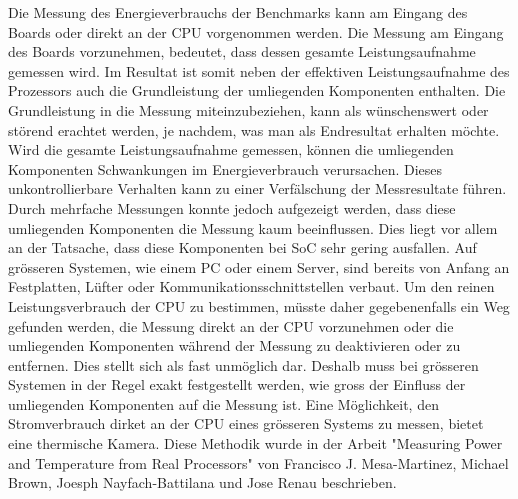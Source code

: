 Die Messung des Energieverbrauchs der Benchmarks kann am Eingang des Boards oder direkt an der CPU vorgenommen werden. Die Messung am Eingang des Boards vorzunehmen, bedeutet, dass dessen gesamte Leistungsaufnahme gemessen wird. Im Resultat ist somit neben der effektiven Leistungsaufnahme des Prozessors auch die Grundleistung der umliegenden Komponenten enthalten. Die Grundleistung in die Messung miteinzubeziehen, kann als wünschenswert oder störend erachtet werden, je nachdem, was man als Endresultat erhalten möchte. Wird die gesamte Leistungsaufnahme gemessen, können die umliegenden Komponenten Schwankungen im Energieverbrauch verursachen. Dieses unkontrollierbare Verhalten kann zu einer Verfälschung der Messresultate führen. Durch mehrfache Messungen konnte jedoch aufgezeigt werden, dass diese umliegenden Komponenten die Messung kaum beeinflussen. Dies liegt vor allem an der Tatsache, dass diese Komponenten bei SoC sehr gering ausfallen. Auf grösseren Systemen, wie einem PC oder einem Server, sind bereits von Anfang an Festplatten, Lüfter oder Kommunikationsschnittstellen verbaut. Um den reinen Leistungsverbrauch der CPU zu bestimmen, müsste daher gegebenenfalls ein Weg gefunden werden, die Messung direkt an der CPU vorzunehmen oder die umliegenden Komponenten während der Messung zu deaktivieren oder zu entfernen. Dies stellt sich als fast unmöglich dar. Deshalb muss bei grösseren Systemen in der Regel exakt festgestellt werden, wie gross der Einfluss der umliegenden Komponenten auf die Messung ist. Eine Möglichkeit, den Stromverbrauch dirket an der CPU eines grösseren Systems zu messen, bietet eine thermische Kamera. Diese Methodik wurde in der Arbeit "Measuring Power and Temperature from Real Processors"\cite{measuring_power_temperature} von Francisco J. Mesa-Martinez, Michael Brown, Joesph Nayfach-Battilana und Jose Renau beschrieben.

